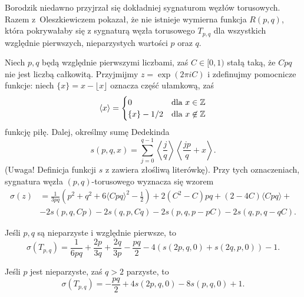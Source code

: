 Borodzik niedawno przyjrzał się dokładniej sygnaturom węzłów torusowych.
%
Razem z~Oleszkiewiczem \cite{borodzik2010} pokazał, że nie istnieje wymierna funkcja $R(p, q)$, która pokrywałaby się z sygnaturą węzła torusowego $T_{p, q}$ dla wszystkich względnie pierwszych, nieparzystych wartości $p$ oraz $q$.
%

\begin{proposition}
    Niech $p, q$ będą względnie pierwszymi liczbami, zaś $C \in [0, 1)$ stałą taką, że $Cpq$ nie jest liczbą całkowitą.
    Przyjmijmy $z = \exp (2 \pi i C)$ i zdefinujmy pomocnicze funkcje: niech $\{x\} = x - \lfloor x \rfloor$ oznacza część ułamkową, zaś
    \begin{equation}
        \langle x \rangle = \begin{cases}
            0 & \text{dla } x \in \mathbb Z \\
            \{x\} - 1/2 & \text{dla } x \not \in \mathbb Z
        \end{cases}
    \end{equation}
    funkcję piłę.
    Dalej, określmy sumę Dedekinda
    \begin{equation}
        s(p, q, x) = \sum_{j = 0}^{q-1} \left\langle \frac {j}{q} \right\rangle \left\langle \frac {jp}{q} + x \right\rangle.
    \end{equation}
    (Uwaga! Definicja funkcji $s$ z \cite{borodzik2010} zawiera złośliwą literówkę).
    Przy tych oznaczeniach, sygnatura węzła $(p, q)$-torusowego wyznacza się wzorem
    \begin{align}
        \sigma(z) & = \frac{1}{3pq} \left(p^2 + q^2 + 6 \langle Cpq \rangle^2 - \frac {1}{2} \right)  + 2(C^2 - C) pq + (2-4C) \langle Cpq \rangle + {} \\
        & - 2s(p, q, Cp) - 2s(q, p, Cq) - 2s(p, q, p-pC) - 2s(q, p, q-qC). \nonumber
    \end{align}
\end{proposition}

\begin{corollary}
    Jeśli $p, q$ są nieparzyste i względnie pierwsze, to
    \begin{equation}
        \sigma(T_{p,q}) = \frac{1}{6pq} + \frac{2p}{3q} + \frac{2q}{3p} - \frac{pq}{2} - 4(s(2p, q, 0) + s(2q, p, 0)) - 1.
    \end{equation}
\end{corollary}

\begin{corollary}
    Jeśli $p$ jest nieparzyste, zaś $q > 2$ parzyste, to
    \begin{equation}
        \sigma(T_{p,q}) = - \frac{pq}{2} + 4s(2p, q, 0) - 8s(p, q, 0) + 1.
    \end{equation}
\end{corollary}

